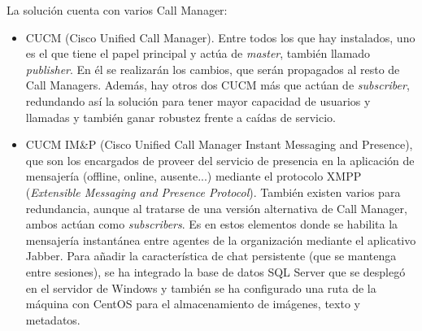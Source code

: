 \documentclass[a4paper, 12pt]{book}
\begin{document}
La solución cuenta con varios Call Manager:
\begin{itemize}
  \item CUCM (Cisco Unified Call Manager). Entre todos los que hay instalados, uno es el que tiene el papel principal y actúa de \emph{master}, también llamado \emph{publisher}. En él se realizarán los cambios, que serán propagados al resto de Call Managers. Además, hay otros dos CUCM más que actúan de \emph{subscriber}, redundando así la solución para tener mayor capacidad de usuarios y llamadas y también ganar robustez frente a caídas de servicio.
  \item CUCM IM\&P (Cisco Unified Call Manager Instant Messaging and Presence), que son los encargados de proveer del servicio de presencia en la aplicación de mensajería (offline, online, ausente...) mediante el protocolo XMPP (\emph{Extensible Messaging and Presence Protocol}). También existen varios para redundancia, aunque al tratarse de una versión alternativa de Call Manager, ambos actúan como \emph{subscribers}.
  Es en estos elementos donde se habilita la mensajería instantánea entre agentes de la organización mediante el aplicativo Jabber. Para añadir la característica de chat persistente (que se mantenga entre sesiones), se ha integrado la base de datos SQL Server que se desplegó en el servidor de Windows y también se ha configurado una ruta de la máquina con CentOS para el almacenamiento de imágenes, texto y metadatos.
\end{itemize}
\end{document}
